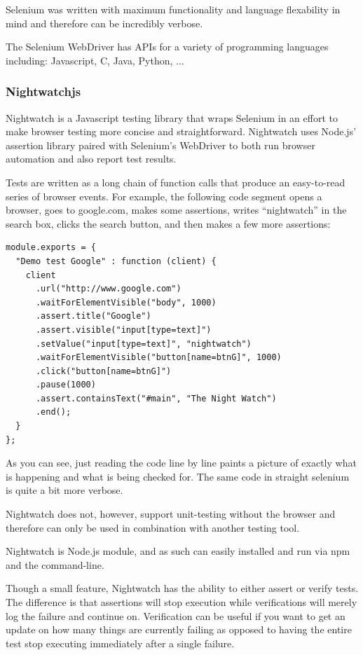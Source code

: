 \documentclass[11pt]{article}
\begin{document}
Selenium was written with maximum functionality and language flexability in mind and therefore can be incredibly verbose.

The Selenium WebDriver has APIs for a variety of programming languages including: Javascript, C, Java, Python, ...

\subsubsection{Nightwatchjs\cite{NightwatchJS}}
Nightwatch is a Javascript testing library that wraps Selenium in an effort to make browser testing more concise and straightforward. Nightwatch uses Node.js' assertion library paired with Selenium's WebDriver to both run browser automation and also report test results.

Tests are written as a long chain of function calls that produce an easy-to-read series of browser events. For example, the following code segment opens a browser, goes to google.com, makes some assertions, writes ``nightwatch'' in the search box, clicks the search button, and then makes a few more assertions:
\begin{lstlisting}
module.exports = {
  "Demo test Google" : function (client) {
    client
      .url("http://www.google.com")
      .waitForElementVisible("body", 1000)
      .assert.title("Google")
      .assert.visible("input[type=text]")
      .setValue("input[type=text]", "nightwatch")
      .waitForElementVisible("button[name=btnG]", 1000)
      .click("button[name=btnG]")
      .pause(1000)
      .assert.containsText("#main", "The Night Watch")
      .end();
  }
};
\end{lstlisting}
As you can see, just reading the code line by line paints a picture of exactly what is happening and what is being checked for. The same code in straight selenium is quite a bit more verbose.


Nightwatch does not, however, support unit-testing without the browser and therefore can only be used in combination with another testing tool.

Nightwatch is Node.js module, and as such can easily installed and run via npm and the command-line.

Though a small feature, Nightwatch has the ability to either assert or verify tests. The difference is that assertions will stop execution while verifications will merely log the failure and continue on. Verification can be useful if you want to get an update on how many things are currently failing as opposed to having the entire test stop executing immediately after a single failure.
\end{document}
